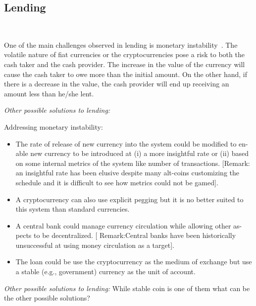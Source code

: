 \subsection{Lending}
~

One of the main challenges observed in lending is  monetary instability~\cite{okoyetoward}. The volatile nature of fiat currencies or the cryptocurrencies pose a risk to both the cash taker and the cash provider. The increase in the value of the currency will cause the cash taker to owe more than the initial amount. On the other hand, if there is a decrease in the value, the cash provider will end up receiving an amount less than he/she lent.



\textit{Other possible solutions to lending:} ~

Addressing monetary instability:
\begin{itemize}
	\item The rate of release of new currency into the system could be modified to en-
	able new currency to be introduced at (i) a more insightful rate or (ii) based
	on some internal metrics of the system like number of transactions. [Remark:
	an insightful rate has been elusive despite many alt-coins customizing the
	schedule and it is difficult to see how metrics could not be gamed].
	\item A cryptocurrency can also use explicit pegging but it is no better suited to this system than standard currencies. 
	\item A central bank could manage currency circulation while allowing other as-
	pects to be decentralized. [	Remark:Central banks have been historically
	unsuccessful at using money circulation as a target].
	\item The loan could be use the cryptocurrency as the medium of exchange but
	use a stable (e.g.,	government) currency as the unit of account.
\end{itemize}

\textit{Other possible solutions to lending:} While stable coin is one of them what can be the other possible solutions?

